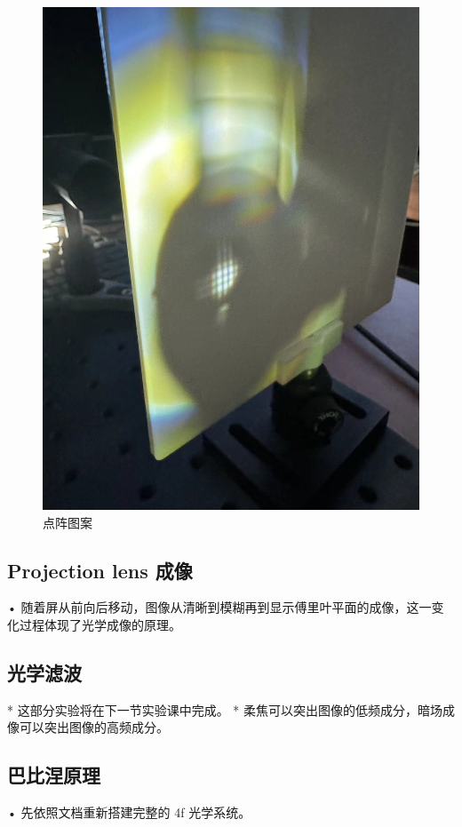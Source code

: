 \documentclass{ctexart}
\begin{document}
\begin{figure}[H]
\begin{minipage}[b]{0.2\textwidth}
    \includegraphics[width=\textwidth]{pictures/微信图片_20241010201031.jpg}
    \caption{点阵图案}
  \end{minipage}
\end{figure}
\subsection{Projection lens 成像}
• 随着屏从前向后移动，图像从清晰到模糊再到显示傅里叶平面的成像，这一变化过程体现了光学成像的原理。
\subsection{光学滤波}
* 这部分实验将在下一节实验课中完成。
* 柔焦可以突出图像的低频成分，暗场成像可以突出图像的高频成分。
\subsection{巴比涅原理}
• 先依照文档重新搭建完整的 4f 光学系统。
\end{document}
